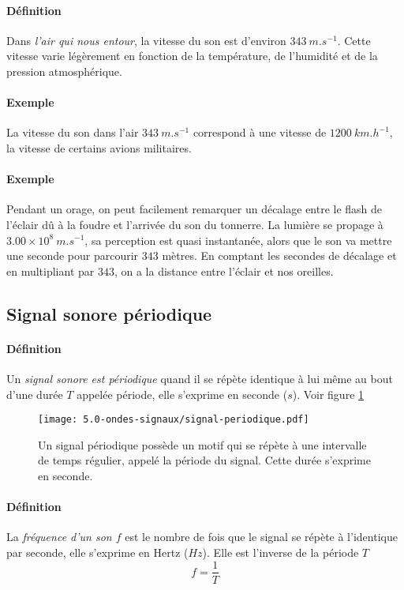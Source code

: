 \paragraph{Définition} Dans \textit{l'air qui nous entour}, la vitesse du son est d'environ
 $343~m.s^{-1}$. Cette vitesse varie légèrement en fonction de la température, de l'humidité et de la pression atmosphérique.
\paragraph{Exemple} La vitesse du son dans l'air $343~m.s^{-1}$ correspond à une
vitesse de $ 1200~km.h^{-1}$, la vitesse de certains avions militaires. 
\paragraph{Exemple} Pendant un orage, on peut facilement remarquer un décalage entre le flash de l'éclair dû à la foudre et l'arrivée du son du tonnerre. La lumière se propage à $3.00 \times 10^8 ~m.s^{-1}$, sa perception est quasi instantanée, alors que le son va mettre une seconde pour parcourir $343$ mètres. En comptant les secondes de décalage et en multipliant par $343$, on a la distance entre l'éclair et nos oreilles.


\subsection{Signal sonore périodique}
\paragraph{Définition} Un \textit{signal sonore est périodique} quand il se répète identique à lui même au bout d'une durée $T$ appelée période, elle s'exprime en seconde ($s$). Voir figure \ref{fig:signal-periodique}
\begin{figure}[h!]
  \begin{center}
      \texttt{[image: 5.0-ondes-signaux/signal-periodique.pdf]}
  \end{center}
  \caption{Un signal périodique possède un motif qui se répète à une intervalle de temps régulier, appelé la période du signal. Cette durée s'exprime en seconde.}
  \label{fig:signal-periodique}
\end{figure}

\paragraph{Définition} La \textit{fréquence d'un son $f$ }est le nombre de fois que le
signal se répète à l'identique par seconde, elle s'exprime en Hertz ($Hz$). Elle 
est l'inverse de la période $T$ $$f = \frac{1}{T}$$

